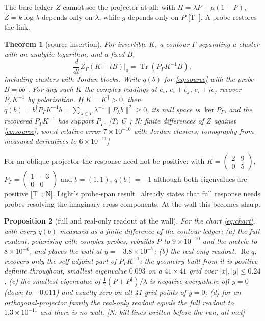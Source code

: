 \documentclass[11pt]{article}
\newtheorem{theorem}{Theorem}
\newtheorem{proposition}[theorem]{Proposition}
\theoremstyle{definition}
\newcommand{\grade}[1]{\textsf{\small[#1]}}
\newcommand{\Tr}{\operatorname{Tr}}
\begin{document}
The bare ledger $Z$ cannot see the projector at all: with $H=\lambda P+\mu(1-P)$, $Z=k\log\lambda$ depends only on $\lambda$, while $g$ depends only on $P$ \grade{T~\cite{GLO}}. A probe restores the link.

\begin{theorem}[source insertion]\label{thm:source}
For invertible $K$, a contour $\Gamma$ separating a cluster with an analytic logarithm, and a fixed $B$,
\begin{equation}\label{eq:source}
\frac{d}{dt}Z_\Gamma(K+tB)\Big|_0=\Tr(P_\Gamma K^{-1}B),
\end{equation}
including clusters with Jordan blocks. Write $q(b)$ for \eqref{eq:source} with the probe $B=bb^\dagger$. For any such $K$ the complex readings at $e_i$, $e_i+e_j$, $e_i+ie_j$ recover $P_\Gamma K^{-1}$ by polarisation. If $K=K^\dagger>0$, then $q(b)=b^\dagger P_\Gamma K^{-1}b=\sum_{\lambda\in\Gamma}\lambda^{-1}\lVert P_\lambda b\rVert^2\ge0$, its null space is $\ker P_\Gamma$, and the recovered $P_\Gamma K^{-1}$ has support $P_\Gamma$. \grade{T; C~\cite{GLO,LKL}; N: finite differences of $Z$ against \eqref{eq:source}, worst relative error $7\times10^{-10}$ with Jordan clusters; tomography from measured derivatives to $6\times10^{-11}$}
\end{theorem}

For an oblique projector the response need not be positive: with $K=\begin{pmatrix}2&9\\0&5\end{pmatrix}$, $P_\Gamma=\begin{pmatrix}1&-3\\0&0\end{pmatrix}$ and $b=(1,1)$, $q(b)=-1$ although both eigenvalues are positive \grade{T~\cite{GLO}; N}. Light's probe-span result~\cite[Sec.~4.9b]{LKL} already states that full response needs probes resolving the imaginary cross components. At the wall this becomes sharp.

\begin{proposition}[full and real-only readout at the wall]\label{prop:readout}
For the chart \eqref{eq:chart}, with every $q(b)$ measured as a finite difference of the contour ledger:
(a) the full readout, polarising with complex probes, rebuilds $P$ to $9\times10^{-10}$ and the metric to $8\times10^{-6}$, and places the wall at $y=-3.8\times10^{-7}$;
(b) the real-only readout, $\operatorname{Re}q$, recovers only the self-adjoint part of $P_\Gamma K^{-1}$; the geometry built from it is positive definite throughout, smallest eigenvalue $0.093$ on a $41\times41$ grid over $|x|,|y|\le0.24$;
(c) the smallest eigenvalue of $\tfrac12(P+P^\dagger)/\lambda$ is negative everywhere off $y=0$ (down to $-0.011$) and exactly zero on all 41 grid points of $y=0$;
(d) for an orthogonal-projector family the real-only readout equals the full readout to $1.3\times10^{-11}$ and there is no wall.
\grade{N: kill lines written before the run, all met}
\end{proposition}
\end{document}
